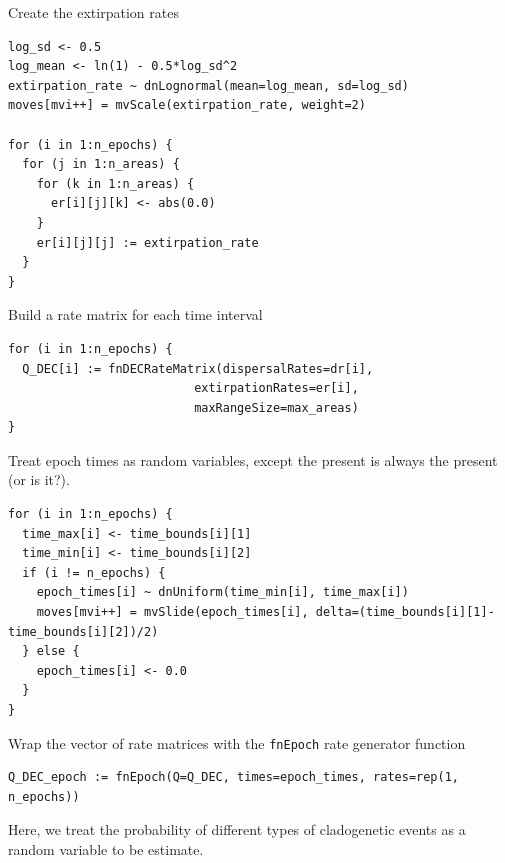 
Create the extirpation rates

\begin{snugshade}
\begin{lstlisting}
log_sd <- 0.5
log_mean <- ln(1) - 0.5*log_sd^2
extirpation_rate ~ dnLognormal(mean=log_mean, sd=log_sd)
moves[mvi++] = mvScale(extirpation_rate, weight=2)

for (i in 1:n_epochs) {
  for (j in 1:n_areas) {
    for (k in 1:n_areas) {
      er[i][j][k] <- abs(0.0) 
    }
    er[i][j][j] := extirpation_rate
  }
}

\end{lstlisting}
\end{snugshade}


Build a rate matrix for each time interval
\begin{snugshade}
\begin{lstlisting}
for (i in 1:n_epochs) {
  Q_DEC[i] := fnDECRateMatrix(dispersalRates=dr[i],
                          extirpationRates=er[i],
                          maxRangeSize=max_areas)
}
\end{lstlisting}
\end{snugshade}


Treat epoch times as random variables, except the present is always the present (or is it?).

\begin{snugshade}
\begin{lstlisting}
for (i in 1:n_epochs) {
  time_max[i] <- time_bounds[i][1]
  time_min[i] <- time_bounds[i][2]
  if (i != n_epochs) {
    epoch_times[i] ~ dnUniform(time_min[i], time_max[i])
    moves[mvi++] = mvSlide(epoch_times[i], delta=(time_bounds[i][1]-time_bounds[i][2])/2)
  } else {
    epoch_times[i] <- 0.0
  }
}
\end{lstlisting}
\end{snugshade}

Wrap the vector of rate matrices with the {\tt fnEpoch} rate generator function

\begin{snugshade}
\begin{lstlisting}
Q_DEC_epoch := fnEpoch(Q=Q_DEC, times=epoch_times, rates=rep(1, n_epochs))
\end{lstlisting}
\end{snugshade}


Here, we treat the probability of different types of cladogenetic events as a random variable to be estimate.

